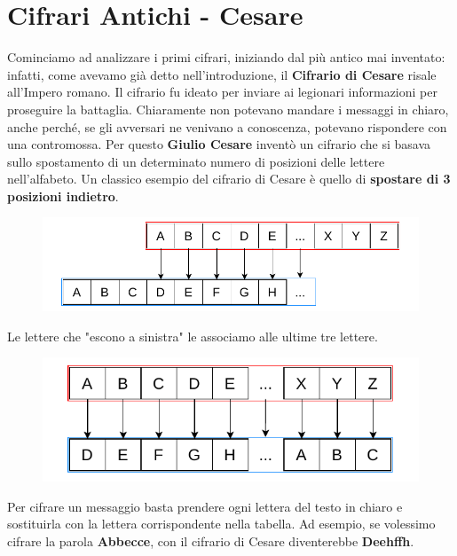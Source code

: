 \documentclass{rapport}
\begin{document}
\newpage







\section{Cifrari Antichi - Cesare}

Cominciamo ad analizzare i primi cifrari, iniziando dal più antico mai inventato: infatti, come avevamo già detto nell'introduzione, il \textbf{Cifrario di Cesare} risale all'Impero romano.  
Il cifrario fu ideato per inviare ai legionari informazioni per proseguire la battaglia.  
Chiaramente non potevano mandare i messaggi in chiaro, anche perché, se gli avversari ne venivano a conoscenza, potevano rispondere con una contromossa.  
Per questo \textbf{Giulio Cesare} inventò un cifrario che si basava sullo spostamento di un determinato numero di posizioni delle lettere nell'alfabeto.  
Un classico esempio del cifrario di Cesare è quello di \textbf{spostare di 3 posizioni indietro}.


\begin{figure}[h]
    \centering
    \includegraphics[width=\linewidth]{logos/1_1_cripto.pdf}
\end{figure}


Le lettere che "escono a sinistra" le associamo alle ultime tre lettere.


\begin{figure}[h]
    \centering
    \includegraphics[width=0.8\linewidth]{logos/1_2_cripto.pdf}
\end{figure}

Per cifrare un messaggio basta prendere ogni lettera del testo in chiaro e sostituirla con la lettera corrispondente nella tabella.  
Ad esempio, se volessimo cifrare la parola \textbf{Abbecce}, con il cifrario di Cesare diventerebbe \textbf{Deehffh}.
\end{document}
